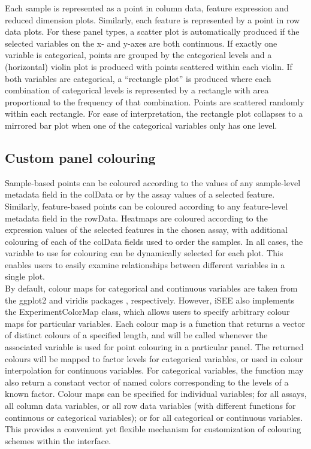 \documentclass[10pt,a4paper,twocolumn]{article}
\begin{document}
Each sample is represented as a point in column data, feature expression and reduced dimension plots.
Similarly, each feature is represented by a point in row data plots.
For these panel types, a scatter plot is automatically produced if the selected variables on the x- and y-axes are both continuous.
If exactly one variable is categorical, points are grouped by the categorical levels and a (horizontal) violin plot is produced with points scattered within each violin.
If both variables are categorical, a ``rectangle plot'' is produced where each combination of categorical levels is represented by a rectangle with area proportional to the frequency of that combination.
Points are scattered randomly within each rectangle.
For ease of interpretation, the rectangle plot collapses to a mirrored bar plot when one of the categorical variables only has one level.

\subsection*{Custom panel colouring}
Sample-based points can be coloured according to the values of any sample-level metadata field in the colData or by the assay values of a selected feature.
Similarly, feature-based points can be coloured according to any feature-level metadata field in the rowData.
Heatmaps are coloured according to the expression values of the selected features in the chosen assay,
with additional colouring of each of the colData fields used to order the samples.
In all cases, the variable to use for colouring can be dynamically selected for each plot.
This enables users to easily examine relationships between different variables in a single plot. \\

By default, colour maps for categorical and continuous variables are taken from the ggplot2 \citep{wickham2009ggplot2} and viridis packages \citep{garnier2018viridis}, respectively.
However, iSEE also implements the ExperimentColorMap class, which allows users to specify arbitrary colour maps for particular variables.
Each colour map is a function that returns a vector of distinct colours of a specified length, and will be called whenever the associated variable is used for point colouring in a particular panel.
The returned colours will be mapped to factor levels for categorical variables, or used in colour interpolation for continuous variables.
For categorical variables, the function may also return a constant vector of named colors corresponding to the levels of a known factor.
Colour maps can be specified for individual variables; for all assays, all column data variables, or all row data variables (with different functions for continuous or categorical variables); or for all categorical or continuous variables.
This provides a convenient yet flexible mechanism for customization of colouring schemes within the interface.
\end{document}
